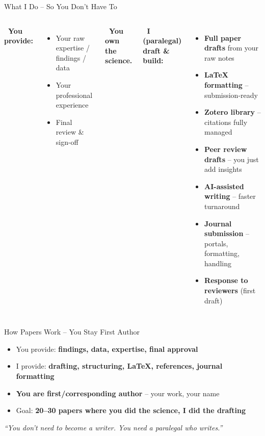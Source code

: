 \documentclass[aspectratio=169, 10pt]{beamer}
\begin{document}
	\begin{frame}{What I Do – So You Don't Have To}
		\begin{columns}[T]
			\textbf{\faUserCog \ You provide:}
			\begin{itemize}
				\item Your raw expertise / findings / data
				\item Your professional experience
				\item Final review \& sign-off
			\end{itemize}
			
			\vspace{0.3cm}
			\textbf{\faCheckDouble \ You own the science.}
			
			\textbf{\faRobot \ I (paralegal) draft \& build:}
			\begin{itemize}
				\item \textbf{Full paper drafts} from your raw notes
				\item \textbf{LaTeX formatting} – submission-ready
				\item \textbf{Zotero library} – citations fully managed
				\item \textbf{Peer review drafts} – you just add insights
				\item \textbf{AI-assisted writing} – faster turnaround
				\item \textbf{Journal submission} – portals, formatting, handling
				\item \textbf{Response to reviewers} (first draft)
			\end{itemize}
		\end{columns}
		
		\vspace{0.3cm}
		\centering
	\end{frame}
	
	\begin{frame}{How Papers Work – You Stay First Author}
		\begin{itemize}
			\item You provide: \textbf{findings, data, expertise, final approval}
			\item I provide: \textbf{drafting, structuring, LaTeX, references, journal formatting}
			\item \textbf{You are first/corresponding author} – your work, your name
			\item Goal: \textbf{20–30 papers where you did the science, I did the drafting}
		\end{itemize}
		
		\vspace{0.3cm}
		\centering
		\textit{“You don't need to become a writer. You need a paralegal who writes.”}
	\end{frame}
	
\end{document}
